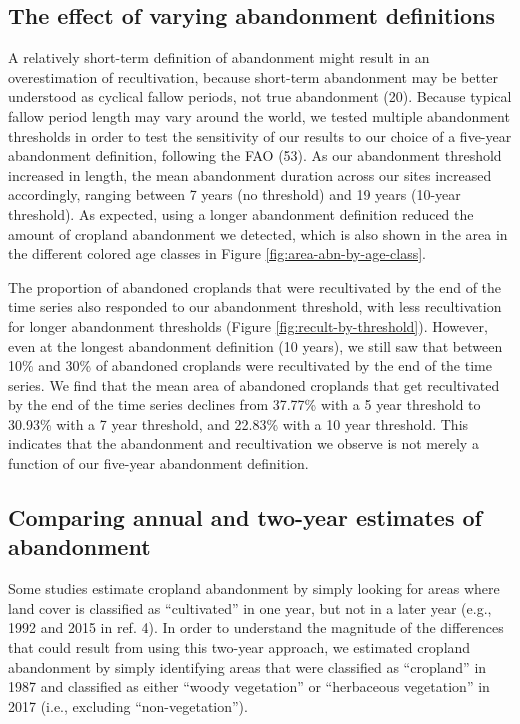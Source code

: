 \documentclass[9pt,twocolumn,twoside,lineno]{pnas-new}
\begin{document}
\hypertarget{abn-thresholds}{%
\subsection{The effect of varying abandonment definitions}\label{abn-thresholds}}

A relatively short-term definition of abandonment might result in an overestimation of recultivation, because short-term abandonment may be better understood as cyclical fallow periods, not true abandonment (20).
Because typical fallow period length may vary around the world, we tested multiple abandonment thresholds in order to test the sensitivity of our results to our choice of a five-year abandonment definition, following the FAO (53).
As our abandonment threshold increased in length, the mean abandonment duration across our sites increased accordingly, ranging between 7 years (no threshold) and 19 years (10-year threshold).
As expected, using a longer abandonment definition reduced the amount of cropland abandonment we detected, which is also shown in the area in the different colored age classes in Figure \ref{fig:area-abn-by-age-class}.

The proportion of abandoned croplands that were recultivated by the end of the time series also responded to our abandonment threshold, with less recultivation for longer abandonment thresholds (Figure \ref{fig:recult-by-threshold}).
However, even at the longest abandonment definition (10 years), we still saw that between 10\% and 30\% of abandoned croplands were recultivated by the end of the time series.
We find that the mean area of abandoned croplands that get recultivated by the end of the time series declines from 37.77\% with a 5 year threshold to 30.93\% with a 7 year threshold, and 22.83\% with a 10 year threshold.
This indicates that the abandonment and recultivation we observe is not merely a function of our five-year abandonment definition.

\hypertarget{twoyr-vs-annual}{%
\subsection{Comparing annual and two-year estimates of abandonment}\label{twoyr-vs-annual}}

Some studies estimate cropland abandonment by simply looking for areas where land cover is classified as ``cultivated'' in one year, but not in a later year (e.g., 1992 and 2015 in ref. 4).
In order to understand the magnitude of the differences that could result from using this two-year approach, we estimated cropland abandonment by simply identifying areas that were classified as ``cropland'' in 1987 and classified as either ``woody vegetation'' or ``herbaceous vegetation'' in 2017 (i.e., excluding ``non-vegetation'').
\end{document}
